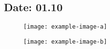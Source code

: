 \documentclass[12pt,a4paper]{article}
\let\origthefigure\thefigure
\newcommand{\thedate}{00.00}
\begin{document}
\begin{mdframed}

	\renewcommand{\thedate}{01.10}
	\section*{Date: 01.10}
	\renewcommand{\thefigure}{\thedate A.\origthefigure}


	\renewcommand{\thefigure}{\thedate A.\origthefigure}
	\begin{mdframed}
	\begin{figure}[H]
		\centering
		\texttt{[image: example-image-a]}
		\caption{}
		\label{fig:01.10}
	\end{figure}
	\end{mdframed}


	
	\begin{figure}[H]
		\centering
		\texttt{[image: example-image-b]}
		\caption{}
		\label{fig:01.11}
	\end{figure}

\end{mdframed}
\end{document}
